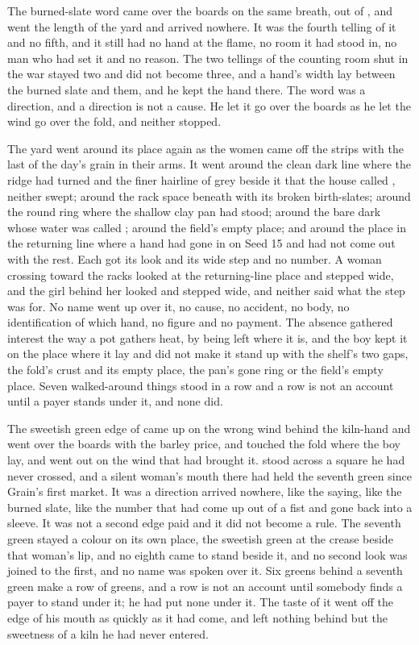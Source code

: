 The burned-slate word came over the boards on the same breath, out of , and went the length of the yard and arrived nowhere. It was the fourth telling of it and no fifth, and it still had no hand at the flame, no room it had stood in, no man who had set it and no reason. The two tellings of the counting room shut in the war stayed two and did not become three, and a hand's width lay between the burned slate and them, and he kept the hand there. The word was a direction, and a direction is not a cause. He let it go over the boards as he let the wind go over the fold, and neither stopped.

The yard went around its place again as the women came off the strips with the last of the day's grain in their arms. It went around the clean dark line where the  ridge had turned and the finer hairline of grey beside it that the house called , neither swept; around the rack space beneath  with its broken birth-slates; around the round ring where the shallow clay pan had stood; around the bare dark  whose water was called ; around the field's empty place; and around the place in the returning line where a hand had gone in on Seed 15 and had not come out with the rest. Each got its look and its wide step and no number. A woman crossing toward the racks looked at the returning-line place and stepped wide, and the girl behind her looked and stepped wide, and neither said what the step was for. No name went up over it, no cause, no accident, no body, no identification of which hand, no figure and no payment. The absence gathered interest the way a pot gathers heat, by being left where it is, and the boy kept it on the place where it lay and did not make it stand up with the shelf's two gaps, the fold's crust and its empty place, the pan's gone ring or the field's empty place. Seven walked-around things stood in a row and a row is not an account until a payer stands under it, and none did.

The sweetish green edge of  came up on the wrong wind behind the kiln-hand and went over the boards with the barley price, and touched the fold where the boy lay, and went out on the wind that had brought it.  stood across a square he had never crossed, and a silent woman's mouth there had held the seventh green since Grain's first market. It was a direction arrived nowhere, like the saying, like the burned slate, like the number that had come up out of a fist and gone back into a sleeve. It was not a second edge paid and it did not become a rule. The seventh green stayed a colour on its own place, the sweetish green at the crease beside that woman's lip, and no eighth came to stand beside it, and no second look was joined to the first, and no name was spoken over it. Six greens behind a seventh green make a row of greens, and a row is not an account until somebody finds a payer to stand under it; he had put none under it. The taste of it went off the edge of his mouth as quickly as it had come, and left nothing behind but the sweetness of a kiln he had never entered.

